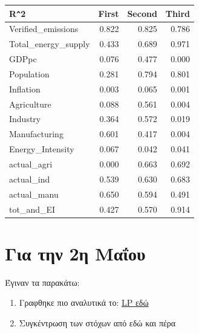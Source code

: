 \documentclass[a4paper,twoside,10pt]{article}
\begin{document}
\begin{table}[H]
	\centering
	\begin{tabular}{lrrr}
		\hline
		 R\verb|^|2 & First & Second & Third \\ 
		\hline
		Verified\_emissions  & 0.822 & 0.825 & 0.786 \\ 
		Total\_energy\_supply   & 0.433 & 0.689 & 0.971 \\ 
		GDPpc   & 0.076 & 0.477 & 0.000 \\ 
		Population   & 0.281 & 0.794 & 0.801 \\ 
		Inflation   & 0.003 & 0.065 & 0.001 \\ 
		Agriculture   & 0.088 & 0.561 & 0.004 \\ 
		Industry   & 0.364 & 0.572 & 0.019 \\ 
		Manufacturing   & 0.601 & 0.417 & 0.004 \\ 
		Energy\_Intensity   & 0.067 & 0.042 & 0.041 \\ 
		actual\_agri   & 0.000 & 0.663 & 0.692 \\ 
		actual\_ind   & 0.539 & 0.630 & 0.683 \\ 
		actual\_manu   & 0.650 & 0.594 & 0.491 \\ 
		tot\_and\_EI   & 0.427 & 0.570 & 0.914 \\ 
		\hline
	\end{tabular}
\end{table}

\newpage

\section{Για την 2η Μαΐου}
Έγιναν τα παρακάτω:

\begin{enumerate}
	\item Γραφθηκε πιο αναλυτικά το: \href{https://docs.google.com/document/d/1DsLPCfHBB-VgMTFy1a4W95VIDkgvmCDs0IXQk__ijGc/edit?usp=sharing}{LP εδώ}
	\item Συγκέντρωση των στόχων από εδώ και πέρα
\end{enumerate}
\end{document}
